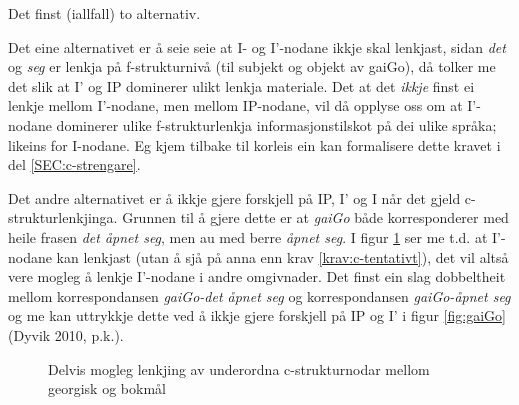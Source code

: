 \documentclass[12pt,a4paper,oneside,draft]{report}
\newcommand{\proj}[2]{\begin{tabular}{c}\footnotesize{#1}\\\normalsize{#2}\end{tabular}}
\newcommand{\ua}{\ensuremath{\uparrow}}
\newcommand{\da}{\ensuremath{\downarrow}}
\begin{document}
Det finst (iallfall) to alternativ. 

Det eine alternativet er å seie seie at I- og I'-nodane ikkje skal
 lenkjast, sidan \emph{det} og \emph{seg} er lenkja på f-strukturnivå (til
 subjekt og objekt av gaiGo), då tolker me det slik at I' og IP
 dominerer ulikt lenkja materiale. Det at det \emph{ikkje} finst ei lenkje
 mellom I'-nodane, men mellom IP-nodane, vil då opplyse oss om at
 I'-nodane dominerer ulike f-strukturlenkja informasjonstilskot på dei
 ulike språka; likeins for I-nodane. Eg kjem tilbake til korleis ein
 kan formalisere dette kravet i del \ref{SEC:c-strengare}.

Det andre alternativet er å ikkje gjere forskjell på IP, I' og I når
 det gjeld c-strukturlenkjinga. Grunnen til å gjere dette er at
 \emph{gaiGo} både korresponderer med heile frasen \emph{det åpnet seg}, men au
 med berre \emph{åpnet seg}.  I figur \ref{fig:PanJara-gaiGo} ser me
 t.d. at I'-nodane kan lenkjast (utan å sjå på anna enn krav
 \ref{krav:c-tentativt}), det vil altså vere mogleg å lenkje I'-nodane
 i andre omgivnader. Det finst ein slag dobbeltheit mellom
 korrespondansen \emph{gaiGo-det åpnet seg} og korrespondansen \emph{gaiGo-åpnet  seg} og me kan uttrykkje dette ved å ikkje gjere forskjell på IP og
 I' i figur \ref{fig:gaiGo} (Dyvik 2010, p.k.).

\begin{figure}[htp]
\centering
{}
\caption{Delvis mogleg lenkjing av underordna c-strukturnodar mellom georgisk og bokmål}
 \label{fig:PanJara-gaiGo}
\end{figure}
\end{document}
